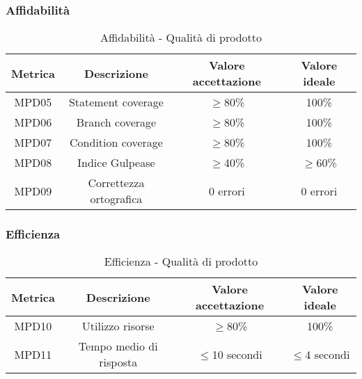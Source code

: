 \documentclass[10pt]{article}
\begin{document}
\begin{justify}
\subsubsection{Affidabilità}
\begin{table}[H]
  \centering
\begin{tabular}{|c|c|c|c|}
  \hline
  \textbf{Metrica} & \textbf{Descrizione} & \textbf{Valore accettazione} & \textbf{Valore ideale}\\
  \hline
  MPD05 & Statement coverage & $\geq$80\% & 100\% \\
  \hline
  MPD06 & Branch coverage & $\geq$80\% & 100\% \\
  \hline
  MPD07 & Condition coverage & $\geq$80\% & 100\% \\
  \hline
  MPD08 & Indice Gulpease & $\geq$40\% & $\geq$60\% \\
  \hline
  MPD09 & Correttezza ortografica & 0 errori & 0 errori \\
  \hline
\end{tabular}
\caption{Affidabilità - Qualità di prodotto}
\label{tab:affidabilità}
\end{table}

\subsubsection{Efficienza}
\begin{table}[H]
  \centering
\begin{tabular}{|c|c|c|c|}
  \hline
  \textbf{Metrica} & \textbf{Descrizione} & \textbf{Valore accettazione} & \textbf{Valore ideale}\\
  \hline
  MPD10 & Utilizzo risorse & $\geq$80\% & 100\% \\
  \hline
  MPD11 & Tempo medio di risposta & $\leq$10 secondi & $\leq$4 secondi \\
  \hline
\end{tabular}
\caption{Efficienza - Qualità di prodotto}
\label{tab:efficienza}
\end{table}


\end{justify}
\end{document}
